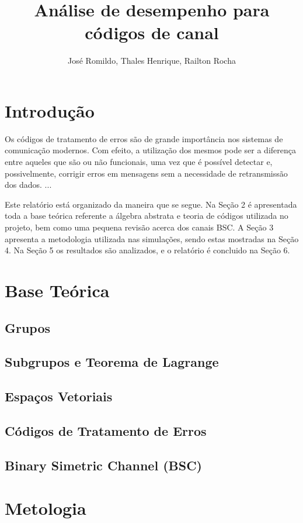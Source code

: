 \documentclass[]{article}
\title{ An{\'a}lise de desempenho para c{\'o}digos de canal}
\author{Jos{\'e} Romildo, Thales Henrique, Railton Rocha}
\begin{document}
\maketitle

\section{Introdução}

\par
Os códigos de tratamento de erros são de grande importância nos sistemas de comunicação modernos. Com efeito, a utilização dos mesmos pode ser a diferença entre aqueles que são ou não funcionais, uma vez que é possível detectar e, possivelmente, corrigir erros em mensagens sem a necessidade de retransmissão dos dados. 
...

Este relatório está organizado da maneira que se segue. Na Seção 2 é apresentada toda a base teórica referente a álgebra abstrata e teoria de códigos utilizada no projeto, bem como uma pequena revisão acerca dos canais BSC. A Seção 3 apresenta a metodologia utilizada nas simulações, sendo estas mostradas na Seção 4. Na Seção 5 os resultados são analizados, e o relatório é concluido na Seção 6.



\section{Base Teórica}
\subsection{Grupos}
\subsection{Subgrupos e Teorema de Lagrange}
\subsection{Espaços Vetoriais}
\subsection{Códigos de Tratamento de Erros}
\subsection{Binary Simetric Channel (BSC)}

\section{Metologia}
\end{document}
